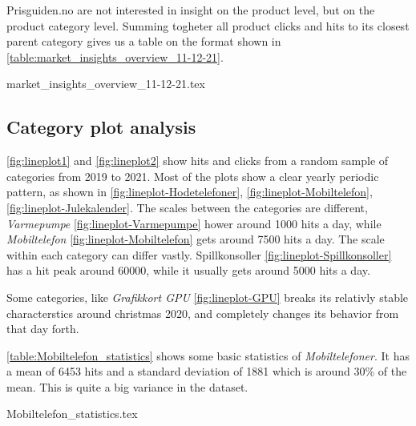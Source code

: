 Prisguiden.no are not interested in insight on the product level, but on the product category level.
Summing togheter all product clicks and hits to its closest parent category
gives us a table on the format shown in \autoref{table:market_insights_overview_11-12-21}.

{market_insights_overview_11-12-21.tex}

\subsection{Category plot analysis}
\autoref{fig:lineplot1} and \autoref{fig:lineplot2} show hits and clicks
from a random sample of categories from 2019 to 2021.
Most of the plots show a clear yearly periodic pattern, as shown in 
\autoref{fig:lineplot-Hodetelefoner},
\autoref{fig:lineplot-Mobiltelefon},
\autoref{fig:lineplot-Julekalender}.
The scales between the categories are different,
\textit{Varmepumpe} \autoref{fig:lineplot-Varmepumpe} hower around 1000 hits a day,
while \textit{Mobiltelefon} \autoref{fig:lineplot-Mobiltelefon} gets around 7500 hits a day.
The scale within each category can differ vastly.
Spillkonsoller \autoref{fig:lineplot-Spillkonsoller} has a hit peak around 60000,
while it usually gets around 5000 hits a day.

Some categories, like \textit{Grafikkort GPU} \autoref{fig:lineplot-GPU}
breaks its relativly stable characterstics around christmas 2020,
and completely changes its behavior from that day forth.

\autoref{table:Mobiltelefon_statistics} shows some basic statistics of \textit{Mobiltelefoner}.
It has a mean of 6453 hits and a standard deviation of 1881 which is
around 30\% of the mean. This is quite a big variance in the dataset.

{Mobiltelefon_statistics.tex}


